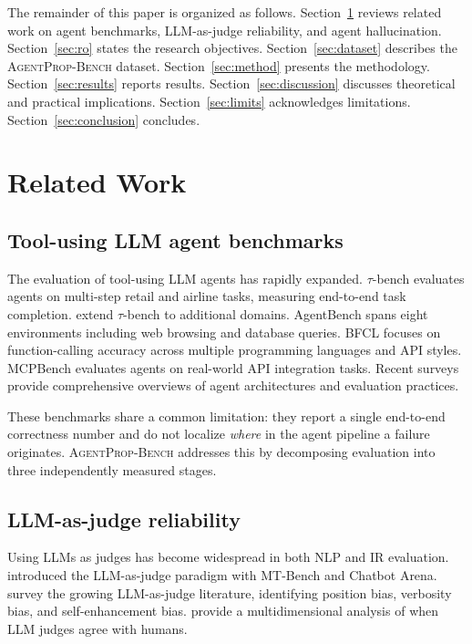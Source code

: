 \documentclass[11pt]{article}
\newcommand{\bench}{\textsc{AgentProp-Bench}\xspace}
\begin{document}
The remainder of this paper is organized as follows.
Section~\ref{sec:related} reviews related work on agent benchmarks,
LLM-as-judge reliability, and agent hallucination.
Section~\ref{sec:ro} states the research objectives.
Section~\ref{sec:dataset} describes the \bench{} dataset.
Section~\ref{sec:method} presents the methodology.
Section~\ref{sec:results} reports results.
Section~\ref{sec:discussion} discusses theoretical and practical
implications.
Section~\ref{sec:limits} acknowledges limitations.
Section~\ref{sec:conclusion} concludes.


\section{Related Work}
\label{sec:related}

\subsection{Tool-using LLM agent benchmarks}

The evaluation of tool-using LLM agents has rapidly expanded.
$\tau$-bench \citep{yao2024tau} evaluates agents on multi-step retail
and airline tasks, measuring end-to-end task completion.
\citet{barres2025tau2} extend $\tau$-bench to additional domains.
AgentBench \citep{liu2024agentbench} spans eight environments including
web browsing and database queries.
BFCL \citep{yan2025bfcl} focuses on function-calling accuracy across
multiple programming languages and API styles.
MCPBench \citep{mcpagentbench2026} evaluates agents on real-world API
integration tasks.
Recent surveys \citep{yehudai2025surveyeval,xie2025agentir} provide
comprehensive overviews of agent architectures and evaluation practices.

These benchmarks share a common limitation: they report a single
end-to-end correctness number and do not localize \emph{where} in the
agent pipeline a failure originates.
\bench{} addresses this by decomposing evaluation into three
independently measured stages.

\subsection{LLM-as-judge reliability}

Using LLMs as judges has become widespread in both NLP and IR evaluation.
\citet{zheng2023judging} introduced the LLM-as-judge paradigm with
MT-Bench and Chatbot Arena.
\citet{gu2024surveyjudge} survey the growing LLM-as-judge literature,
identifying position bias, verbosity bias, and self-enhancement bias.
\citet{bavaresco2024llmsjudges} provide a multidimensional analysis of
when LLM judges agree with humans.
\end{document}
